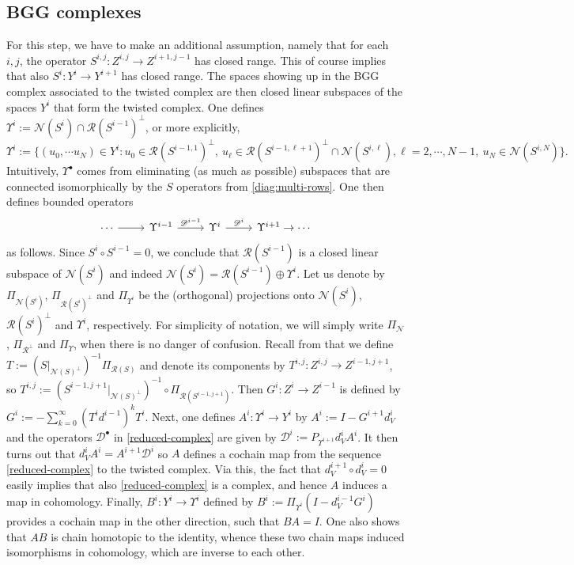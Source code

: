 \documentclass[11pt]{amsart}
\newcommand{\0}{\mathaccent23}
\renewcommand\ker{\mathcal{N}}
\newcommand\ran{\mathcal{R}}
\newcommand{\bs}{{\scriptscriptstyle \bullet}}
\begin{document}
\subsection{BGG complexes}\label{sec:bgg}

For this step, we have to make an additional assumption, namely that for each $i,j$, the operator $S^{i,j}:Z^{i,j}\to Z^{i+1,j-1}$ has closed range. This of course implies that also $S^i:Y^i\to Y^{i+1}$ has closed range. The spaces showing up in the BGG complex associated to the twisted complex are then closed linear subspaces of the spaces $Y^i$ that form the twisted complex. One defines $\Upsilon^{i}:=\ker(S^{i})\cap \ran(S^{i-1})^{\perp}$, or more explicitly, 
$$
\Upsilon^{i}:=\{(u_{0}, \cdots u_{N})\in Y^{i}: u_{0}\in \ran(S^{i-1, 1})^{\perp}, ~u_{\ell}\in \ran(S^{i-1, \ell+1})^{\perp}\cap \ker(S^{i, \ell}), \ell=2, \cdots, N-1, ~ u_{N}\in \ker(S^{i, N})\}.
$$
Intuitively, $\Upsilon^{\bs}$ comes from eliminating (as much as possible) subspaces that are connected isomorphically by the $S$ operators from \eqref{diag:multi-rows}. One then defines bounded operators
 \begin{equation}\label{reduced-complex}
\begin{tikzcd}
 \cdots \arrow{r}{ }&\Upsilon^{i-1} \arrow{r}{\mathscr{D}^{i-1}}  &\Upsilon^{i} \arrow{r}{\mathscr{D}^{i}}   &\Upsilon^{i+1}\to \cdots
 \end{tikzcd}
 \end{equation}
 as follows. Since $S^i\circ S^{i-1}=0$, we conclude that $\ran(S^{i-1})$ is a closed linear subspace of $\ker(S^i)$ and indeed $\ker(S^i)=\ran(S^{i-1})\oplus\Upsilon^i$. Let us denote by $\Pi_{\ker(S^{i})}$, $\Pi_{\ran(S^{i})^{\perp}}$ and $\Pi_{\Upsilon^{i}}$ be the (orthogonal) projections onto $\ker(S^{i})$, $\ran(S^{i})^{\perp}$ and $\Upsilon^{i}$, respectively. For simplicity of notation, we will simply write $\Pi_{\ker}$, $\Pi_{\ran^{\perp}}$ and $\Pi_{\Upsilon}$, when there is no danger of confusion.
Recall from \cite{vcap2022bgg} that we define $T:=(S|_{\ker(S)^\perp})^{-1}\Pi_{\ran(S)}$ and denote its components by $T^{i, j}: Z^{i, j}\to Z^{i-1, j+1}$, so $T^{i, j}:=(S^{i-1, j+1}|_{\ker(S)^\perp})^{-1}\circ \Pi_{\ran(S^{i-1, j+1})}$. Then $G^{i}: Z^{i}\to Z^{i-1}$ is defined by $G^{i}:=-\sum_{k=0}^{\infty}(T^{i}d^{i-1})^{k}T^{i}$. Next, one defines $A^i:\Upsilon^i\to Y^i$ by $A^{i}:=I-G^{i+1}d_{V}^{i}$ and the operators $\mathscr{D}^{\bs}$ in \eqref{reduced-complex} are given by $\mathscr{D}^{i}:=P_{\Upsilon^{i+1}}d_{V}^{i}A^{i}$. It then turns out that $d^i_VA^i=A^{i+1}\mathscr{D}^{i}$ so $A$ defines a cochain map from the sequence \eqref{reduced-complex} to the twisted complex. Via this, the fact that $d^{i+1}_V\circ d^i_V=0$ easily implies that also \eqref{reduced-complex} is a complex, and hence $A$ induces a map in cohomology. Finally,  $B^{i}: Y^{i}\to \Upsilon^{i}$ defined by $B^{i}:=\Pi_{\Upsilon^{i}}(I-d_{V}^{i-1}G^{i})$ provides a cochain map in the other direction, such that $BA=I$. One also shows that $AB$ is chain homotopic to the identity, whence these two chain maps induced isomorphisms in cohomology, which are inverse to each other. 
\end{document}

